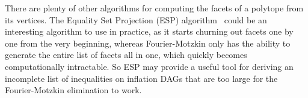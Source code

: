 There are plenty of other algorithms for computing the facets of a polytope from its vertices. The Equality Set Projection (ESP) algorithm~\cite{jones2004equality,JonesThesis2005} could be an interesting algorithm to use in practice, as it starts churning out facets one by one from the very beginning, whereas Fourier-Motzkin only has the ability to generate the entire list of facets all in one, which quickly becomes computationally intractable. So ESP may provide a useful tool for deriving an incomplete list of inequalities on inflation DAGs that are too large for the Fourier-Motzkin elimination to work.



